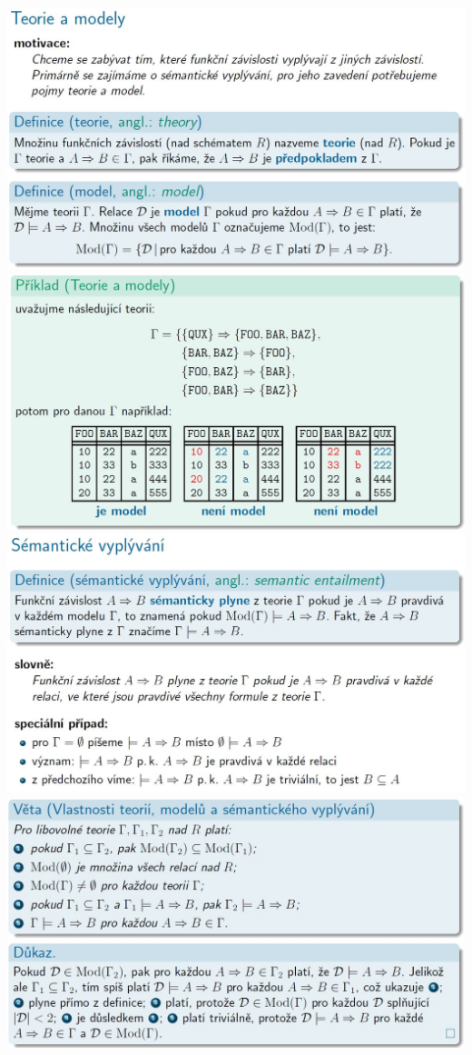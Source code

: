 \documentclass[10pt,a4paper]{article}
\begin{document}
\includegraphics[scale=0.37]{img/5-04.jpg}\\[2ex]
\includegraphics[scale=0.37]{img/5-05.jpg}\\[2ex]
\includegraphics[scale=0.37]{img/5-06.jpg}\\[2ex]
\includegraphics[scale=0.37]{img/5-07.jpg}\\[2ex]
\end{document}
